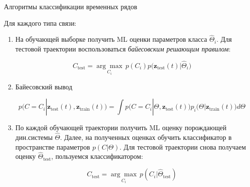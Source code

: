 \documentclass[10pt]{beamer}
\theoremstyle{definition}
\begin{document}
	\begin{frame}{Алгоритмы классификации временных рядов}
		
		Для каждого типа связи:
		
		\begin{enumerate}
			\item На обучающей выборке получить ML оценки параметров класса $\hat{\Theta}_i$. Для тестовой траектории воспользоваться \emph{байесовским решающим правилом}:
			
			\begin{equation*}
				C_{\text{test}} = \underset{C_i}{\arg \max} \, p(C_i) p\big( \textbf{z}_{\text{test}}(t) | \hat{\Theta}_i \big)
			\end{equation*} 	
			
			\item Байесовский вывод
			
			\begin{equation*}
				p \big(C = C_i | \textbf{z}_{\text{test}}(t), \textbf{z}_{\text{train}}(t) \big) = \int p \big( C = C_i | \Theta, \textbf{z}_{\text{test}}(t) \big) p_i \big( \Theta | \textbf{z}_{\text{train}}(t) \big) d\Theta
			\end{equation*}
			
			\item По каждой обучающей траектории получить ML оценку порождающей дин.системы $\hat{\Theta}$. Далее, на полученных оценках обучить классификатор в пространстве параметров $p(C | \Theta)$. Для тестовой траектории снова получаем оценку $\hat{\Theta}_{\text{test}}$, пользуемся классификатором:
			
			\begin{equation*}
				C_{\text{test}} = \underset{C_i}{\arg \max} \, p(C_i | \hat{\Theta}_{\text{test}})
			\end{equation*}
		\end{enumerate}
		
	\end{frame}	
	
\end{document}
